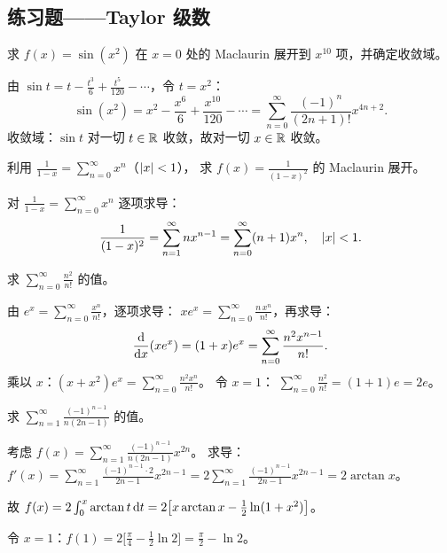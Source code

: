 \documentclass{ctexart}
\begin{document}
\subsection{练习题——Taylor 级数}

\begin{exercise}[代入法]
  求 $f(x) = \sin(x^2)$ 在 $x=0$ 处的 Maclaurin 展开到 $x^{10}$ 项，并确定收敛域。
\end{exercise}

\begin{solution}
  由 $\sin t = t - \frac{t^3}{6} + \frac{t^5}{120} - \cdots$，令 $t = x^2$：
  \[
    \sin(x^2) = x^2 - \frac{x^6}{6} + \frac{x^{10}}{120} - \cdots
    = \sum_{n=0}^\infty \frac{(-1)^n}{(2n+1)!} x^{4n+2}.
  \]
  收敛域：$\sin t$ 对一切 $t \in \mathbb{R}$ 收敛，故对一切 $x \in \mathbb{R}$ 收敛。
\end{solution}

\begin{exercise}[逐项求导/积分]
  利用 $\frac{1}{1-x} = \sum_{n=0}^\infty x^n$（$\left| x \right| < 1$），
  求 $f(x) = \frac{1}{(1-x)^2}$ 的 Maclaurin 展开。
\end{exercise}

\begin{solution}
  对 $\frac{1}{1-x} = \sum_{n=0}^\infty x^n$ 逐项求导：
  \[
    \frac{1}{(1-x)^2} = \sum_{n=1}^\infty n x^{n-1}
    = \sum_{n=0}^\infty (n+1) x^n, \quad \left| x \right| < 1.
  \]
\end{solution}

\begin{exercise}[级数求和——基本]
  求 $\sum_{n=0}^\infty \frac{n^2}{n!}$ 的值。
\end{exercise}

\begin{solution}
  由 $e^x = \sum_{n=0}^\infty \frac{x^n}{n!}$，逐项求导：
  $xe^x = \sum_{n=0}^\infty \frac{n\, x^n}{n!}$，再求导：
  \[
    \frac{\mathrm{d}}{\mathrm{d} x}(xe^x) = (1+x)e^x = \sum_{n=0}^\infty \frac{n^2 x^{n-1}}{n!}.
  \]
  乘以 $x$：$(x+x^2)e^x = \sum_{n=0}^\infty \frac{n^2 x^n}{n!}$。
  令 $x = 1$：
  $\sum_{n=0}^\infty \frac{n^2}{n!} = (1+1)e = 2e$。
\end{solution}

\begin{exercise}[级数求和——进阶]
  求 $\sum_{n=1}^\infty \frac{(-1)^{n-1}}{n(2n-1)}$ 的值。
\end{exercise}

\begin{solution}
  考虑 $f(x) = \sum_{n=1}^\infty \frac{(-1)^{n-1}}{n(2n-1)} x^{2n}$。
  求导：$f'(x) = \sum_{n=1}^\infty \frac{(-1)^{n-1} \cdot 2}{2n-1} x^{2n-1}
  = 2\sum_{n=1}^\infty \frac{(-1)^{n-1}}{2n-1} x^{2n-1} = 2\arctan x$。

  故 $f(x) = 2\int_0^x \arctan t \,\mathrm{d} t
  = 2\bigl[x\arctan x - \frac{1}{2}\ln(1+x^2)\bigr]$。

  令 $x=1$：$f(1) = 2\bigl[\frac{\pi}{4} - \frac{1}{2}\ln 2\bigr] = \frac{\pi}{2} - \ln 2$。
\end{solution}
\end{document}
